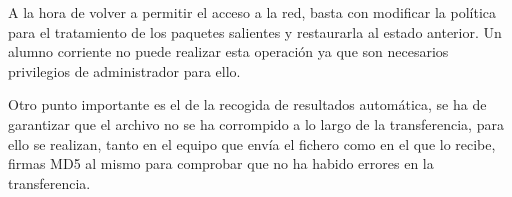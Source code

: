 A la hora de volver a permitir el acceso a la red, basta con modificar la política para el tratamiento de los paquetes salientes y restaurarla al estado anterior. Un alumno corriente no puede realizar esta operación ya que son necesarios privilegios de administrador para ello.
\newline

Otro punto importante es el de la recogida de resultados automática, se ha de garantizar que el archivo no se ha corrompido a lo largo de la transferencia, para ello se realizan, tanto en el equipo que envía el fichero como en el que lo recibe, firmas MD5 al mismo para comprobar que no ha habido errores en la transferencia.
